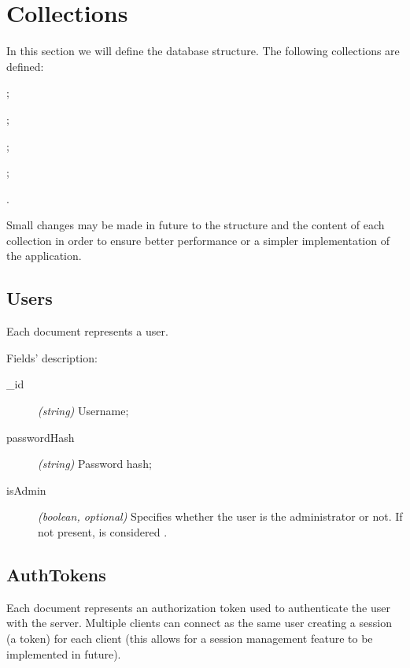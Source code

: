 \section{Collections}\label{sec:collections}

In this section we will define the database structure. The following collections
are defined:
\begin{enumerate*}[label=]
	\item {};
	\item {};
	\item {};
	\item {};
	\item {}.
\end{enumerate*}

Small changes may be made in future to the structure and the content of each
collection in order to ensure better performance or a simpler implementation of
the application.

\subsection{Users}

Each document represents a user.



Fields' description:
\begin{description}
	\item[\_id] \textit{(string)} Username;
	\item[passwordHash] \textit{(string)} Password hash;
	\item[isAdmin] \textit{(boolean, optional)} Specifies whether the user
		is the administrator or not. If not present, is considered
		.
\end{description}

\subsection{AuthTokens}

Each document represents an authorization token used to authenticate the user
with the server. Multiple clients can connect as the same user creating a
session (a token) for each client (this allows for a session management feature
to be implemented in future).



